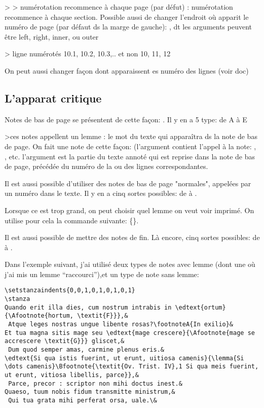  >  > numérotation recommence à chaque page  (par défut) : numérotation recommence à chaque section.
Possible aussi de changer l'endroit où apparit le numéro de page (par défaut ds la marge de gauche): , dt les arguments peuvent être left, right, inner, ou outer

  > ligne numérotés 10.1, 10.2, 10.3,.. et non 10, 11, 12 

On peut aussi changer façon dont apparaissent es numéro des lignes (voir doc)



\subsection{L'apparat critique}

Notes de bas de page se présentent de cette façon:  . Il y en a 5 type: de A à E


>ces notes appellent un lemme : le mot du texte qui apparaîtra ds la  note de bas de page. On fait une note de cette façon:  (l'argument  contient l'appel à la note: , , etc.
l'argument  est la partie du texte annoté qui est reprise dans la note de bas de page, précédée du numéro de la ou des lignes correspondantes. 

Il est aussi possible d'utiliser  des  notes de bas de page "normales", appelées par un numéro dans le texte. Il y en a cinq sortes  possibles: de  à .

Lorsque ce  est trop grand, on peut choisir quel lemme on veut voir imprimé. On utilise pour cela la commande suivante: 
\{\}. 

\begin{plusloins}
Il est aussi possible de mettre des notes de fin. Là encore, cinq sortes possibles:  de  à .
\end{plusloins}

Dans l'exemple suivant, j'ai utilisé deux types de notes avec lemme (dont une où j'ai mis un lemme \enquote{raccourci}),et  un type de note sans lemme:


\begin{verbatim}
\setstanzaindents{0,0,1,0,1,0,1,0,1}
\stanza
Quando erit illa dies, cum nostrum intrabis in \edtext{ortum}{\Afootnote{hortum, \textit{F}}},&
 Atque leges nostras ungue libente rosas?\footnoteA{In exilio}&
Et tua magna sitis mage seu \edtext{mage crescere}{\Afootnote{mage se accrescere \textit{G}}} gliscet,&
 Dum quod semper amas, carmine plenus eris.&
\edtext{Si qua istis fuerint, ut erunt, uitiosa camenis}{\lemma{Si \dots camenis}\Bfootnote{\textit{Ov. Trist. IV},1 Si qua meis fuerint, ut erunt, vitiosa libellis, parce}},&
 Parce, precor : scriptor non mihi doctus inest.&
Quaeso, tuum nobis fidum transmitte ministrum,&
 Qui tua grata mihi perferat orsa, uale.\&
\end{verbatim}


